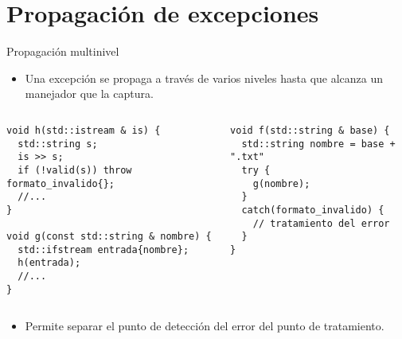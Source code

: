 \section{Propagación de excepciones}

\begin{frame}[t,fragile]{Propagación multinivel}
\begin{itemize}
  \item Una excepción se propaga a través de varios niveles hasta que alcanza
        un manejador que la captura.
\end{itemize}

\begin{columns}[T]

\begin{lstlisting}
void h(std::istream & is) {
  std::string s;
  is >> s;
  if (!valid(s)) throw formato_invalido{};
  //...
}

void g(const std::string & nombre) {
  std::ifstream entrada{nombre};
  h(entrada);
  //...
}
\end{lstlisting}

\begin{lstlisting}
void f(std::string & base) {
  std::string nombre = base + ".txt"
  try {
    g(nombre);
  }
  catch(formato_invalido) {
    // tratamiento del error
  }
}
\end{lstlisting}
\end{columns}

\begin{itemize}
  \item Permite separar el punto de detección del error del punto de tratamiento.
\end{itemize}
\end{frame}

